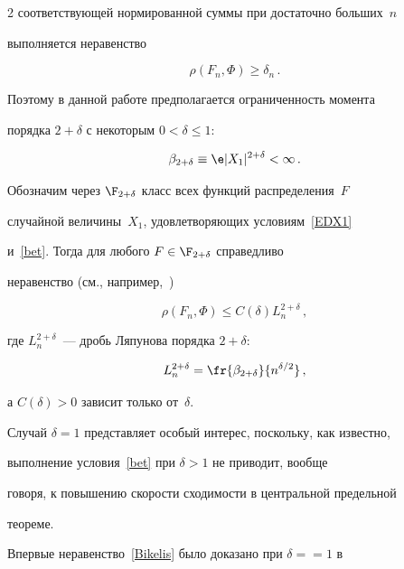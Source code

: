 \begin{multicols}{2}
соответствующей нормированной суммы при достаточно больших~$n$


выполняется неравенство


$$


\rho(F_n,\Phi)\ge\delta_n\,.


$$


Поэтому в данной работе предполагается ограниченность момента


порядка $2+\delta$ с некоторым $0<\delta\le1$:


\begin{equation}


\label{bet}


\bet\equiv \e |X_1|^{2+\delta}<\infty\,.


\end{equation}


Обозначим через $\F_{2+\delta}$ класс всех функций распределения~$F$


случайной величины~$X_1$, удов\-ле\-тво\-ря\-ющих  условиям~\eqref{EDX1}


и~\eqref{bet}. Тогда для любого $F\in\F_{2+\delta}$ справедливо


неравенство (см., например,~\cite{Petrov1972})


\begin{equation}


\label{Bikelis}


\rho(F_n,\Phi)\le C(\delta) L_n^{2+\delta}\,,


\end{equation}


где $L_n^{2+\delta}$~--- дробь Ляпунова порядка ${2+\delta}$:


$$


L_n^{2+\delta}=\fr{\bet}{n^{\delta/2}}\,,


$$


а $C(\delta)>0$ зависит только от~$\delta$.





Случай $\delta=1$ представляет особый интерес, поскольку, как известно,


выполнение условия~\eqref{bet} при $\delta>1$ не приводит, вообще


говоря, к повышению скорости сходимости в центральной предельной


тео\-реме.





Впервые неравенство~\eqref{Bikelis} было доказано при $\delta=$\linebreak $=1$ в



\end{multicols}
